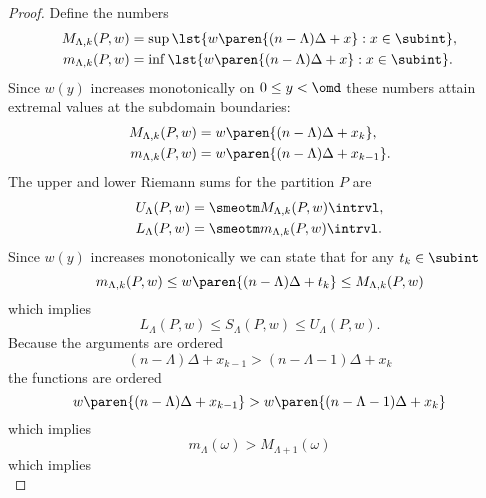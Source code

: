 \begin{proof}
Define the numbers
\begin{equation}
  \begin{split}
    M_{\Lambda,k}(P,w) 
      &= \sup \lst{w\paren{ (n-\Lambda)\Delta+x }: x \in \subint }, \\
    m_{\Lambda,k}(P,w) &= \inf \lst{w\paren{ (n-\Lambda)\Delta+x }: x \in \subint }. 
  \end{split}
\end{equation}
Since $w(y)$ increases monotonically on $0\le y < \omd$ these numbers attain extremal values at the subdomain boundaries:
\begin{equation}
  \begin{split}
    M_{\Lambda,k}(P,w) 
      &= w\paren{ (n-\Lambda)\Delta+x_{k} }, \\
    m_{\Lambda,k}(P,w) &= w\paren{ (n-\Lambda)\Delta+x_{k-1} }. 
  \end{split}
\end{equation}
The upper and lower Riemann sums for the partition $P$ are
\begin{equation}
  \begin{split}
    U_{\Lambda}(P,w) &= \smeotm M_{\Lambda,k}(P,w) \intrvl, \\
    L_{\Lambda}(P,w) &= \smeotm m_{\Lambda,k}(P,w) \intrvl.
  \end{split}
\end{equation}
Since $w(y)$ increases monotonically we can state that for any $t_{k}\in\subint$
\begin{equation}
  m_{\Lambda,k}(P,w) \le w\paren{ (n-\Lambda)\Delta + t_{k} }\le M_{\Lambda,k}(P,w)
\end{equation}
which implies
\begin{equation}
  L_{\Lambda}(P,w) \le S_{\Lambda}(P,w) \le U_{\Lambda}(P,w).
\end{equation}
Because the arguments are ordered
\begin{equation}
  (n-\Lambda)\Delta + x_{k-1} > (n-\Lambda-1)\Delta + x_{k}
\end{equation}
the functions are ordered
\begin{equation}
  w\paren{ (n-\Lambda)\Delta + x_{k-1} } > w\paren{ (n-\Lambda-1)\Delta + x_{k} }
\end{equation}
which implies
\begin{equation}
  m_{\Lambda}(\omega) > M_{\Lambda+1}(\omega)
\end{equation}
which implies
\begin{equation}

\end{equation}
\end{proof}
